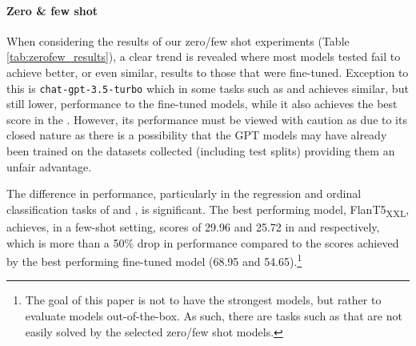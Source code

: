 \paragraph{Zero \& few shot}
When considering the results of our zero/few shot experiments (Table \ref{tab:zerofew_results}), a clear trend is revealed where most models tested fail to achieve better, or even similar, results to those that were fine-tuned. Exception to this is \texttt{chat-gpt-3.5-turbo} which in some tasks such as {\TempoWiC} and {\TweetNERD} achieves similar, but still lower, performance to the fine-tuned models, while it also achieves the best score in the {\TweetQA}. However, its performance must be viewed with caution as due to its closed nature as there is a possibility that the GPT models may have already been trained on the datasets collected (including test splits) providing them an unfair advantage.

The difference in performance, particularly in the regression and ordinal classification tasks of {\TweetIntimacy} and {\TweetSentiment}, is significant. The best performing model, FlanT5\textsubscript{XXL}, achieves, in a few-shot setting, scores of 29.96 and 25.72 in {\TweetIntimacy} and {\TweetSentiment} respectively, which is more than a 50\% drop in performance compared to the scores  achieved by the best performing fine-tuned model (68.95 and 54.65).\footnote{The goal of this paper is not to have the strongest models, but rather to evaluate models out-of-the-box. As such, there are tasks such as {\TweetEmoji} that are not easily solved by the selected zero/few shot models.}



